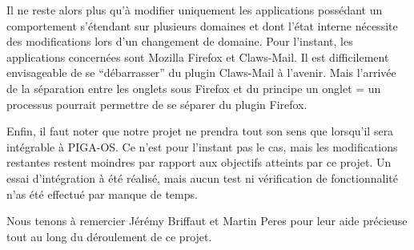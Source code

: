 \documentclass[pdftex,a4paper,titlepage,11pt]{article}
\begin{document}
Il ne reste alors plus qu'à modifier uniquement les applications possédant un comportement s'étendant sur plusieurs domaines et dont l'état interne nécessite des modifications lors d'un changement de domaine. Pour l'instant, les applications concernées sont Mozilla Firefox et Claws-Mail. Il est difficilement envisageable de se ``débarrasser'' du plugin Claws-Mail à l'avenir. Mais l'arrivée de la séparation entre les onglets sous Firefox et du principe un onglet = un processus pourrait permettre de se séparer du plugin Firefox.

Enfin, il faut noter que notre projet ne prendra tout son sens que lorsqu'il sera intégrable à PIGA-OS. Ce n'est pour l'instant pas le cas, mais les modifications restantes restent moindres par rapport aux objectifs atteints par ce projet. Un essai d'intégration à été réalisé, mais aucun test ni vérification de fonctionnalité n'as été effectué par manque de temps.

Nous tenons à remercier Jérémy Briffaut et Martin Peres pour leur aide précieuse tout au long du déroulement de ce projet.


\newpage
\end{document}
